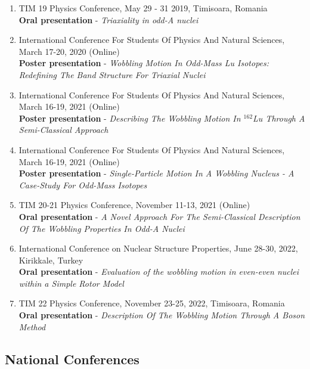 \begin{enumerate}
    \item TIM 19 Physics Conference, May 29 - 31 2019, Timisoara, Romania\\
    \faMicrophone{} {}\textbf{Oral presentation} - \emph{Triaxiality in odd-A nuclei}
    \item International Conference For Students Of Physics And Natural Sciences, March 17-20, 2020 (Online)\\
    \faDesktop{} {}\textbf{Poster presentation} - \emph{Wobbling Motion In Odd-Mass Lu Isotopes: Redefining The Band Structure For Triaxial Nuclei}
    \item International Conference For Students Of Physics And Natural Sciences, March 16-19, 2021 (Online)\\
    \faDesktop{} {}\textbf{Poster presentation} - \emph{Describing The Wobbling Motion In $^{162}$Lu Through A Semi-Classical Approach}
    \item International Conference For Students Of Physics And Natural Sciences, March 16-19, 2021 (Online)\\
    \faDesktop{} {}\textbf{Poster presentation} - \emph{Single-Particle Motion In A Wobbling Nucleus - A Case-Study For Odd-Mass Isotopes}
    \item TIM 20-21 Physics Conference, November 11-13, 2021 (Online)\\
    \faMicrophone{} {}\textbf{Oral presentation} - \emph{A Novel Approach For The Semi-Classical Description Of The Wobbling Properties In Odd-A Nuclei}
    \item International Conference on Nuclear Structure Properties, June 28-30, 2022, Kirikkale, Turkey\\
    \faMicrophone{} {}\textbf{Oral presentation} - \emph{Evaluation of the wobbling motion in even-even nuclei within a Simple Rotor Model}
    \item TIM 22 Physics Conference, November 23-25, 2022, Timisoara, Romania\\
    \faMicrophone{} {}\textbf{Oral presentation} - \emph{Description Of The Wobbling Motion Through A Boson Method}
\end{enumerate}

\subsection{National Conferences}
